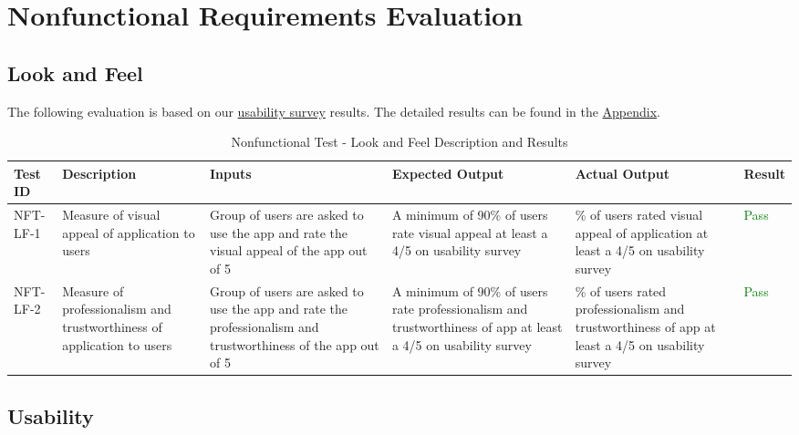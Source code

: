 \documentclass[12pt, titlepage]{article}
\begin{document}
\newpage{}
\section{Nonfunctional Requirements Evaluation}

\subsection{Look and Feel}

The following evaluation is based on our \href{https://forms.gle/GUkhZDEA7SVjYAVi8}{usability survey} results. The detailed results can be found in the \hyperref[sec:AppSurveyResults]{Appendix}.

\renewcommand{\arraystretch}{1.8}%
\begin{longtable}{| m{.12\linewidth} |>{\raggedright\arraybackslash} m{.16\linewidth} |>{\raggedright\arraybackslash} m{.19\linewidth}|>{\raggedright\arraybackslash} m{.21\linewidth} |>{\raggedright\arraybackslash} m{.21\linewidth}|>{\centering\arraybackslash} m{.08\linewidth}|}
\caption{Nonfunctional Test - Look and Feel Description and Results}
\label{tab:LookAndFeelTestResults}
\\ \hline
\textbf{Test ID} & \textbf{Description} & \textbf{Inputs} & \textbf{Expected Output} & \textbf{Actual Output} & \textbf{Result} \\
\hline
\endfirsthead
\endfoot

\hline
NFT-LF-1 & Measure of visual appeal of application to users & Group of users are asked to use the app and rate the visual appeal of the app out of 5 & A minimum of 90\% of users rate visual appeal at least a 4/5 on usability survey & 95.5\% of users rated visual appeal of application at least a 4/5 on usability survey & \textcolor{Green}{Pass} \\
\hline
NFT-LF-2 & Measure of professionalism and trustworthiness of application to users & Group of users are asked to use the app and rate the professionalism and trustworthiness of the app out of 5 & A minimum of 90\% of users rate professionalism and trustworthiness of app at least a 4/5 on usability survey & 95.5\% of users rated professionalism and trustworthiness of app at least a 4/5 on usability survey & \textcolor{Green}{Pass} \\
\hline

\end{longtable}

\subsection{Usability}
\end{document}
